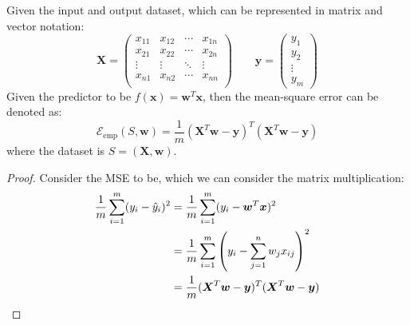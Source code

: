 \begin{lemma}
    Given the input and output dataset, which can be represented in matrix and vector notation:
    \begin{equation*}
        \boldsymbol X = \begin{pmatrix}
            x_{11} & x_{12} & \cdots & x_{1n} \\
            x_{21} & x_{22} & \cdots & x_{2n} \\
            \vdots & \vdots & \ddots & \vdots \\
            x_{n1} & x_{n2} & \cdots & x_{nn} \\
        \end{pmatrix} \qquad \boldsymbol y = \begin{pmatrix}
            y_1 \\ y_2 \\ \vdots \\ y_m
        \end{pmatrix}
    \end{equation*}
    Given the predictor to be $f(\boldsymbol x) = \boldsymbol w^T\boldsymbol x$, then the mean-square error can be denoted as:
    \begin{equation*}
        \mathcal{E}_\text{emp}(S, \boldsymbol w) = \frac{1}{m} (\boldsymbol X^T\boldsymbol w - \boldsymbol y)^T(\boldsymbol X^T\boldsymbol w - \boldsymbol y)
    \end{equation*}
    where the dataset is $S = (\boldsymbol X, \boldsymbol w)$. 
\end{lemma}
\begin{proof}
    Consider the MSE to be, which we can consider the matrix multiplication:
    \begin{equation*}
    \begin{aligned}
        \frac{1}{m}\sum^m_{i=1} (y_i - \hat{y}_i)^2 &= \frac{1}{m}\sum^m_{i=1}(y_i - \boldsymbol w^T\boldsymbol x)^2 \\
        &= \frac{1}{m}\sum^m_{i=1}\left( y_i - \sum^n_{j=1}w_jx_{ij} \right)^2 \\
        &= \frac{1}{m}(\boldsymbol X^T\boldsymbol w - \boldsymbol y)^T(\boldsymbol X^T\boldsymbol w - \boldsymbol y)
    \end{aligned}
    \end{equation*}
\end{proof}

